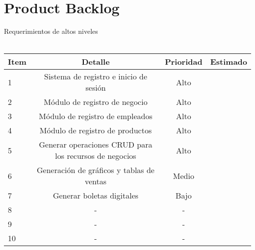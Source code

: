 \chapter{Product Backlog}
Requerimientos de altos niveles
\\\\

\begin{tabular}{||l | c | c | r||}
	\hline
	\hline
	Item & Detalle & Prioridad & Estimado \\
	\hline
	1 & Sistema de registro e inicio de sesión & Alto &  \\
	\hline
	2 & Módulo de registro de negocio & Alto &  \\
	\hline
	3 & Módulo de registro de empleados & Alto &  \\
	\hline
	4 & Módulo de registro de productos & Alto &  \\
	\hline
	5 & Generar operaciones CRUD para los recursos de negocios & Alto &  \\
	\hline	
	6 & Generación de gráficos y tablas de ventas & Medio &  \\
	\hline
	7 & Generar boletas digitales & Bajo &  \\
	\hline
	8 & - & - &  \\
	\hline
	9 & - & - &  \\
	\hline
	10 & - & - &  \\
	\hline
\end{tabular}
